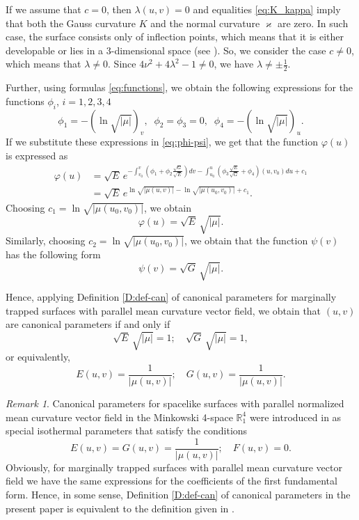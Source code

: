 \documentclass[12pt]{amsart}
\newcommand{\R}{\mathbb R}
\theoremstyle{definition}
\theoremstyle{remark}
\newtheorem{remark}{Remark}[section]
\newcommand{\ds}{\displaystyle}
\numberwithin{equation}{section}
\begin{document}
If we assume that $c = 0$, then $\lambda(u,v) =0$ and equalities \eqref{eq:K_kappa} imply that both 
the Gauss curvature $K$ and the  normal curvature $\varkappa$ are zero. In  such case, the surface consists only of inflection points, which means that 
it is either developable or lies in a 3-dimensional space (see \cite{Lane}). So, we consider the case $c \neq 0$, which means that $\lambda \neq 0$. 
Since  $4\nu^2+4\lambda^2-1\ne0$, we have $\lambda\ne\pm \frac{1}{2}$.

 Further, using formulas \eqref{eq:functions}, we obtain the following expressions for the functions $\phi_i$, $i=1,2,3,4$
\begin{equation*}
	\phi_1 = -(\ln\sqrt{|\mu|})_v, \;\; \phi_2 =\phi_3 = 0, \;\; \phi_4  =-(\ln\sqrt{|\mu|})_u.
\end{equation*}
If we substitute these expressions in \eqref{eq:phi-psi}, we get that the function $\varphi(u)$ is expressed as
\begin{equation*}
	\begin{split}
		\varphi(u) & =\sqrt E\, e^{\ds-\int_{v_0}^v\left(\phi_1+\phi_2\frac{\sqrt G}{\sqrt E}\right)dv
			-\int_{u_0}^u\left(\phi_3\frac{\sqrt E}{\sqrt G}+\phi_4\right)(u,v_0)du+c_1}  \\ & =
		\sqrt E\, e^{\ds \ln{\sqrt{|\mu(u,v)|}} - \ln{\sqrt{|\mu(u_0,v_0)|}} + c_1}.
\end{split} \end{equation*}
Choosing $c_1=\ln{\sqrt{|\mu(u_0,v_0)|}}$, we  obtain
\begin{equation}\label{E:phi}
 \varphi(u)  =\sqrt E\,\sqrt{|\mu|}.
\end{equation}
Similarly, choosing $c_2=\ln{\sqrt{|\mu(u_0,v_0)|}}$, we obtain that the  function $\psi(v)$ has the following form
\begin{equation}\label{E:psi}
\psi(v)  =\sqrt G\,\sqrt{|\mu|}.
\end{equation}

Hence, applying Definition \ref{D:def-can}  of canonical parameters for marginally trapped surfaces with parallel mean curvature vector field, we obtain that $(u,v)$ are canonical parameters if and only if 
  $$\sqrt E\,\sqrt{|\mu|} = 1; \quad \sqrt G\,\sqrt{|\mu|} = 1,$$
	or equivalently, 
 $$E(u,v)=\frac{1}{|\mu(u,v)|}; \quad G(u,v)=\frac{1}{|\mu(u,v)|}.$$

\begin{remark}
Canonical parameters for spacelike surfaces with parallel normalized mean curvature vector field in the Minkowski 4-space $\R^4_1$ were introduced in \cite{G-M-Fil} as special isothermal parameters that satisfy the conditions 
$$E(u,v)=G(u,v)=\frac{1}{|\mu(u,v)|}; \quad F(u,v)=0.$$
Obviously, for marginally trapped surfaces with parallel mean curvature vector field  we have the same expressions for the coefficients of the first fundamental form.  Hence, in some sense, Definition \ref{D:def-can} of canonical parameters in the present paper is equivalent to the definition given in \cite{G-M-Fil}.
\end{remark}
\end{document}
